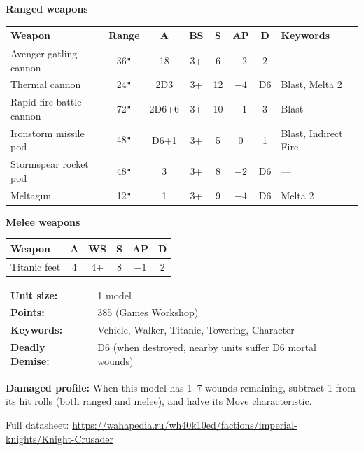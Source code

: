 \documentclass[11pt,a4paper]{article}
\begin{document}
\vspace{2mm}

\textbf{Ranged weapons}

\begin{center}
\renewcommand{\arraystretch}{1.2}
\begin{tabular}{l c c c c c c l}
  \toprule
  \textbf{Weapon} & \textbf{Range} & \textbf{A} & \textbf{BS} & \textbf{S} & \textbf{AP} & \textbf{D} & \textbf{Keywords} \\
  \midrule
  Avenger gatling cannon & 36\texttt{"} & 18 & 3+ & 6 & $-2$ & 2 & --- \\
  Thermal cannon & 24\texttt{"} & 2D3 & 3+ & 12 & $-4$ & D6 & Blast, Melta 2 \\
  Rapid-fire battle cannon & 72\texttt{"} & 2D6+6 & 3+ & 10 & $-1$ & 3 & Blast \\
  Ironstorm missile pod & 48\texttt{"} & D6+1 & 3+ & 5 & 0 & 1 & Blast, Indirect Fire \\
  Stormspear rocket pod & 48\texttt{"} & 3 & 3+ & 8 & $-2$ & D6 & --- \\
  Meltagun & 12\texttt{"} & 1 & 3+ & 9 & $-4$ & D6 & Melta 2 \\
  \bottomrule
\end{tabular}
\end{center}

\vspace{2mm}

\textbf{Melee weapons}

\begin{center}
\renewcommand{\arraystretch}{1.2}
\begin{tabular}{l c c c c c}
  \toprule
  \textbf{Weapon} & \textbf{A} & \textbf{WS} & \textbf{S} & \textbf{AP} & \textbf{D} \\
  \midrule
  Titanic feet & 4 & 4+ & 8 & $-1$ & 2 \\
  \bottomrule
\end{tabular}
\end{center}

\vspace{2mm}

\begin{tabular}{@{}ll@{}}
  \textbf{Unit size:} & 1 model \\
  \textbf{Points:} & 385 (Games Workshop) \\
  \textbf{Keywords:} & Vehicle, Walker, Titanic, Towering, Character \\
  \textbf{Deadly Demise:} & D6 (when destroyed, nearby units suffer D6 mortal wounds) \\
\end{tabular}

\vspace{1mm}

\textbf{Damaged profile:} When this model has 1--7 wounds remaining, subtract 1
from its hit rolls (both ranged and melee), and halve its Move characteristic.

\vspace{1mm}
{\small\color{greytext}
Full datasheet: \url{https://wahapedia.ru/wh40k10ed/factions/imperial-knights/Knight-Crusader}}
\label{sec:datasheets-end}
\end{document}
